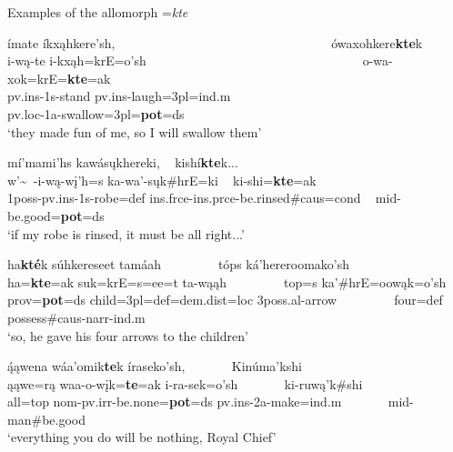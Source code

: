 \begin{exe}

\item\label{potentialkte} Examples of the allomorph =\textit{kte}

	\begin{xlist}
	
	\item\label{potentialkte1}
	\glll ímate íkxąhkere'sh, ~ ~ ~ ~ ~ ~ ~ ~ ~ ~ ~ ~ ~ ~ ~ ~ ~ ~ ~ ~   ówaxohkere\textbf{kte}k\\
	i-wą-te i-kxąh=krE=o'sh ~ ~ ~ ~ ~ ~ ~ ~ ~ ~ ~ ~ ~ ~ ~ ~ ~ ~ ~ ~  o-wa-xok=krE=\textbf{kte}=ak\\
	pv.ins-1s-\textnormal{stand} pv.ins-\textnormal{laugh}=3pl=ind.m  ~ ~ ~ ~ ~ ~ ~ ~ ~ ~ ~ ~ ~ ~ ~ ~ ~ ~ ~ ~  pv.loc-1a-\textnormal{swallow}=3pl=\textbf{pot}=ds\\
	\glt `they made fun of me, so I will swallow them' \citep[149]{hollow1973a}

	\item\label{potentialkte2}
	\glll mí'mami'hs kawásųkhereki, ~  kishí\textbf{kte}k...\\
	w'\~~-i-wą-wį'h=s ka-wa'-sųk\#hrE=ki ~  ki-shi=\textbf{kte}=ak\\
	1poss-pv.ins-1s-\textnormal{robe}=def ins.frce-ins.prce-\textnormal{be.rinsed}\#caus=cond ~  mid-\textnormal{be.good}=\textbf{pot}=ds\\
	\glt `if my robe is rinsed, it must be all right...' \citep[17]{hollow1973a}

	\item\label{potentialkte3}
	\glll ha\textbf{kté}k súhkereseet tamáah ~ ~ ~ ~ ~  tóps ká'hereroomako'sh\\
	ha=\textbf{kte}=ak suk=krE=s=ee=t ta-wąąh ~ ~ ~ ~ ~  top=s ka'\#hrE=oowąk=o'sh\\
	prov=\textbf{pot}=ds \textnormal{child}=3pl=def=dem.dist=loc 3poss.al-\textnormal{arrow} ~ ~ ~ ~ ~ \textnormal{four}=def \textnormal{possess}\#caus-narr-ind.m\\
	\glt `so, he gave his four arrows to the children' \citep[31]{hollow1973a}

	\item\label{potentialkte4}
	\glll ą́ąwena wáa'omik\textbf{te}k íraseko'sh, ~ ~ ~ ~   Kinúma'kshi\\
	ąąwe=rą waa-o-wįk=\textbf{te}=ak i-ra-sek=o'sh ~ ~ ~ ~  ki-ruwą'k\#shi\\
	\textnormal{all}=top nom-pv.irr-\textnormal{be.none}=\textbf{pot}=ds pv.ins-2a-\textnormal{make}=ind.m ~ ~ ~ ~  mid-\textnormal{man}\#\textnormal{be.good}\\
	\glt `everything you do will be nothing, Royal Chief' \citep[47]{hollow1973b}
	
	\end{xlist}

\end{exe}

